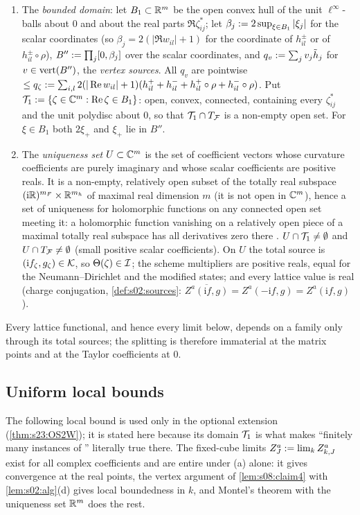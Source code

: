 \begin{definition}
\begin{enumerate}[label=\textup{(\roman*)},leftmargin=*,nosep]
\item The \emph{bounded domain}: let $B_1\subset\mathbb R^m$ be the open convex hull of the unit $\ell^\infty$-balls about $0$ and about the real parts $\Re\zeta^*_{ij}$; let $\beta_j:=2\sup_{\xi\in B_1}|\xi_j|$ for the scalar coordinates (so $\beta_j=2(|\Re w_{il}|+1)$ for the coordinate of $h^\pm_{il}$ or of $h^\pm_{il}\circ\rho$), $B'':=\prod_j[0,\beta_j]$ over the scalar coordinates, and $q_v:=\sum_jv_j\tilde h_j$ for $v\in\operatorname{vert}(B'')$, the \emph{vertex sources}. All $q_v$ are pointwise $\le q_\zeta:=\sum_{i,l}2(|\operatorname{Re} w_{il}|+1)(h^+_{il}+h^-_{il}+h^+_{il}\circ\rho+h^-_{il}\circ\rho)$. Put $\mathcal T_1:=\{\zeta\in\mathbb C^m:\operatorname{Re}\zeta\in B_1\}$: open, convex, connected, containing every $\zeta^*_{ij}$ and the unit polydisc about $0$, so that $\mathcal T_1\cap T_{\mathcal F}$ is a non-empty open set. For $\xi\in B_1$ both $2\xi_+$ and $\xi_+$ lie in $B''$.
\item The \emph{uniqueness set} $U\subset\mathbb C^m$ is the set of coefficient vectors whose curvature coefficients are purely imaginary and whose scalar coefficients are positive reals. It is a non-empty, relatively open subset of the totally real subspace $(\mathrm i\mathbb R)^{m_F}\times\mathbb R^{m_h}$ of maximal real dimension $m$ (it is not open in $\mathbb C^m$), hence a set of uniqueness for holomorphic functions on any connected open set meeting it: a holomorphic function vanishing on a relatively open piece of a maximal totally real subspace has all derivatives zero there \cite{Hor90}. $U\cap\mathcal T_1\ne\emptyset$ and $U\cap T_{\mathcal F}\ne\emptyset$ (small positive scalar coefficients). On $U$ the total source is $(\mathrm if_\zeta,g_\zeta)\in\mathcal K$, so $\Theta(\zeta)\in\mathcal I$; the scheme multipliers are positive reals, equal for the Neumann--Dirichlet and the modified states; and every lattice value is real (charge conjugation, \cref{def:s02:sources}: $\overline{Z^a(\mathrm if,g)}=Z^a(-\mathrm if,g)=Z^a(\mathrm if,g)$).
\end{enumerate}
Every lattice functional, and hence every limit below, depends on a family only through its total sources; the splitting is therefore immaterial at the matrix points and at the Taylor coefficients at $0$.
\end{definition}

\subsection{Uniform local bounds}

The following local bound is used only in the optional extension (\cref{thm:s23:OS2W}); it is stated here because its domain $\mathcal T_1$ is what makes ``finitely many instances of \Wtwo'' literally true there. The fixed-cube limits $Z^a_J:=\lim_kZ^a_{k,J}$ exist for all complex coefficients and are entire under \Wtwo(a) alone: it gives convergence at the real points, the vertex argument of \cref{lem:s08:claim4} with \cref{lem:s02:alg}(d) gives local boundedness in $k$, and Montel's theorem with the uniqueness set $\mathbb R^m$ does the rest.

